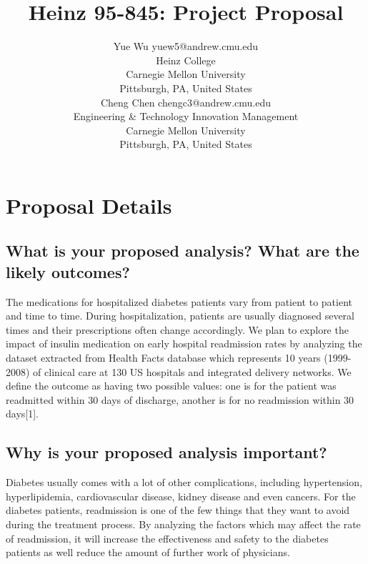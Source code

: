 \documentclass[twoside,11pt]{article}
\begin{document}
\title{Heinz 95-845: Project Proposal}

\author{\name Yue Wu \email yuew5@andrew.cmu.edu \\
       \addr Heinz College\\
       Carnegie Mellon University\\
       Pittsburgh, PA, United States \\
       \AND
       \name  Cheng Chen \email chengc3@andrew.cmu.edu \\
       \addr Engineering \& Technology Innovation Management\\
       Carnegie Mellon University\\
       Pittsburgh, PA, United States}
\maketitle




\section{Proposal Details} \label{details}

\subsection{What is your proposed analysis? What are the likely outcomes?}
The medications for hospitalized diabetes patients vary from patient to patient and time to time. During hospitalization, patients are usually diagnosed several times and their prescriptions often change accordingly. We plan to explore the impact of insulin medication on early hospital readmission rates by analyzing the dataset extracted from Health Facts database which represents 10 years (1999-2008) of clinical care at 130 US hospitals and integrated delivery networks. We define the outcome as having two possible values: one is for the patient was readmitted within 30 days of discharge, another is for no readmission within 30 days[1].

\subsection{Why is your proposed analysis important?}
  Diabetes usually comes with a lot of other complications, including hypertension, hyperlipidemia, cardiovascular disease, kidney disease and even cancers. For the diabetes patients, readmission is one of the few things that they want to avoid during the treatment process. By analyzing the factors which may affect the rate of readmission, it will increase the effectiveness and safety to the diabetes patients as well reduce the amount of further work of physicians.  
\end{document}
